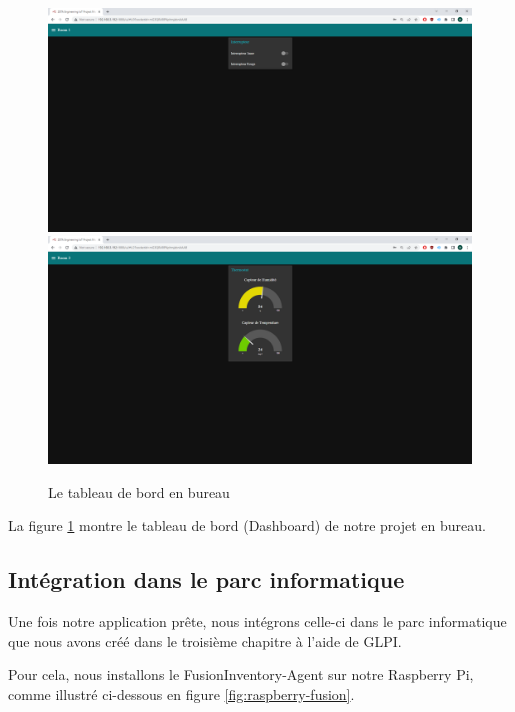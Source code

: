 \begin{figure}[H]
\centering
\includegraphics[width=15cm]{Images/150131.png}
\includegraphics[width=15cm]{Images/150156.png}
\caption{Le tableau de bord en bureau}
\label{Chap4.3.23}
\end{figure}

La figure \ref{Chap4.3.23} montre le tableau de bord (Dashboard) de notre projet en bureau.

\subsection{Intégration dans le parc informatique}

Une fois notre application prête, nous intégrons celle-ci dans le parc informatique que nous avons créé dans le troisième chapitre à l'aide de GLPI.

Pour cela, nous installons le FusionInventory-Agent sur notre Raspberry Pi, comme illustré ci-dessous en figure \ref{fig:raspberry-fusion}.

